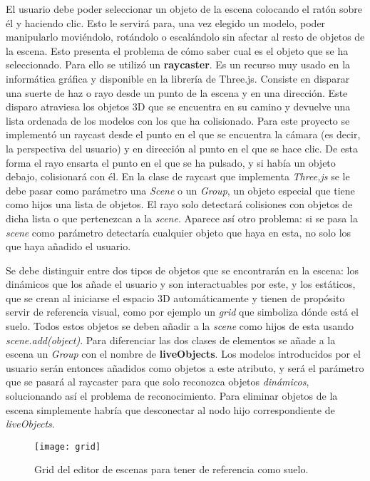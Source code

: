 El usuario debe poder seleccionar un objeto de la escena colocando el ratón sobre él y haciendo clic. Esto le servirá para, una vez elegido un modelo, poder manipularlo moviéndolo, rotándolo o escalándolo sin afectar al resto de objetos de la escena. Esto presenta el problema de cómo saber cual es el objeto que se ha seleccionado. Para ello se utilizó un \textbf{raycaster}. Es un recurso muy usado en la informática gráfica y disponible en la librería de Three.js. Consiste en disparar una suerte de haz o rayo desde un punto de la escena y en una dirección. Este disparo atraviesa los objetos 3D que se encuentra en su camino y devuelve una lista ordenada de los modelos con los que ha colisionado. Para este proyecto se implementó un raycast desde el punto en el que se encuentra la cámara (es decir, la perspectiva del usuario) y en dirección al punto en el que se hace clic. De esta forma el rayo ensarta el punto en el que se ha pulsado, y si había un objeto debajo, colisionará con él. En la clase de raycast que implementa \textit{Three,js} se le debe pasar como parámetro una \textit{Scene} o un \textit{Group}, un objeto especial que tiene como hijos una lista de objetos. El rayo solo detectará colisiones con objetos de dicha lista o que pertenezcan a la \textit{scene}. Aparece así otro problema: si se pasa la \textit{scene} como parámetro detectaría cualquier objeto que haya en esta, no solo los que haya añadido el usuario.

Se debe distinguir entre dos tipos de objetos que se encontrarán en la escena: los dinámicos que los añade el usuario y son interactuables por este, y los estáticos, que se crean al iniciarse el espacio 3D automáticamente y tienen de propósito servir de referencia visual, como por ejemplo un \textit{grid} que simboliza dónde está el suelo. Todos estos objetos se deben añadir a la \textit{scene} como hijos de esta usando \textit{scene.add(object)}. Para diferenciar las dos clases de elementos se añade a la escena un \textit{Group} con el nombre de \textbf{liveObjects}. Los modelos introducidos por el usuario serán entonces añadidos como objetos a este atributo, y será el parámetro que se pasará al raycaster para que solo reconozca objetos \textit{dinámicos}, solucionando así el problema de reconocimiento. Para eliminar objetos de la escena simplemente habría que desconectar al nodo hijo correspondiente de \textit{liveObjects}.

\begin{figure}[h]
    \centering
    \texttt{[image: grid]}
    \caption[Grid del editor de escenas]{Grid del editor de escenas para tener de referencia como suelo.}
\end{figure}


